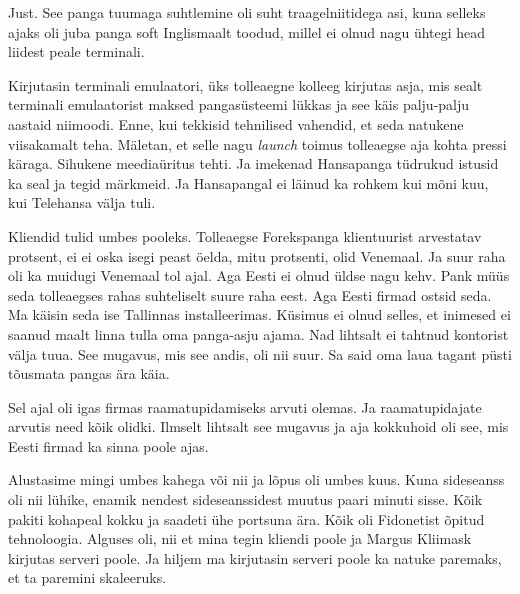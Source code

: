 Just. See panga tuumaga suhtlemine oli suht traagelniitidega asi, kuna selleks ajaks oli juba panga soft  Inglismaalt toodud, millel ei olnud nagu ühtegi head liidest peale terminali.


Kirjutasin terminali emulaatori, üks tolleaegne kolleeg kirjutas asja, mis sealt terminali emulaatorist maksed pangasüsteemi lükkas ja see käis palju-palju aastaid niimoodi. Enne, kui  tekkisid tehnilised vahendid, et seda natukene viisakamalt teha. Mäletan, et  selle nagu \emph{launch} toimus tolleaegse  aja kohta pressi käraga. Sihukene meediaüritus tehti. Ja imekenad Hansapanga tüdrukud istusid ka seal ja tegid märkmeid. Ja Hansapangal ei läinud ka rohkem kui mõni kuu, kui Telehansa välja tuli.


Kliendid tulid umbes pooleks.  Tolleaegse Forekspanga klientuurist arvestatav protsent, ei ei oska isegi peast öelda, mitu protsenti, olid Venemaal. Ja suur raha oli ka muidugi Venemaal tol ajal. Aga Eesti ei olnud üldse nagu kehv. Pank müüs seda tolleaegses rahas suhteliselt suure raha eest. Aga Eesti firmad ostsid seda. Ma käisin seda ise Tallinnas installeerimas. Küsimus ei olnud selles, et inimesed ei saanud maalt linna tulla oma panga-asju ajama. Nad lihtsalt ei tahtnud kontorist välja tuua. See mugavus, mis see andis, oli nii suur. Sa said oma laua tagant püsti tõusmata pangas ära käia.


Sel ajal oli igas firmas raamatupidamiseks arvuti olemas. Ja raamatupidajate arvutis need kõik olidki. Ilmselt lihtsalt see mugavus ja aja kokkuhoid oli see, mis  Eesti firmad ka sinna poole ajas.


Alustasime  mingi umbes kahega või nii ja  lõpus oli  umbes kuus. Kuna sideseanss oli nii lühike, enamik nendest sideseanssidest muutus paari minuti sisse. Kõik pakiti kohapeal  kokku ja saadeti ühe portsuna ära. Kõik oli Fidonetist õpitud tehnoloogia. Alguses oli, nii et mina tegin kliendi poole ja Margus Kliimask kirjutas serveri poole. Ja hiljem ma kirjutasin serveri poole ka natuke paremaks, et ta paremini skaleeruks. 


